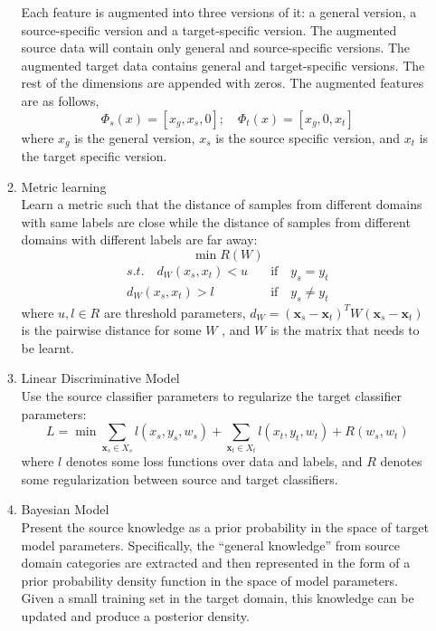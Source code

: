\documentclass[prodmode]{acmsmall}  %
\begin{document}
\begin{itemize}
\begin{enumerate}
Each feature is augmented into three versions of it: a general version, a source-specific version and a target-specific version. The augmented source data will contain only general and source-specific versions. The augmented target data contains general and target-specific versions. The rest of the dimensions are appended with zeros. The augmented features are as follows,
\begin{equation}
\Phi_s(x)=[x_g,x_s,0];\quad \Phi_t(x)=[x_g,0,x_t]
\end{equation}
where $x_g$ is the general version, $x_s$ is the source specific version, and $x_t$ is the target specific version. 
\item Metric learning~\cite{Saenko2010}\\
Learn a metric such that the distance of samples from different domains with same labels are close while the distance of samples from different domains with different labels are far away:
\begin{equation}
\min R(W)
\end{equation}
\begin{align*}
s.t. \quad   d_W(x_s,x_t)< \mathit{u} \quad & \text{if} \quad y_s=y_t\\
   d_W(x_s,x_t)> \mathit{l} \quad & \text{if} \quad y_s\neq y_t
\end{align*}
where ${u,l}\in R$ are threshold parameters, $d_W = (\mathbf{x}_s-\mathbf{x}_t)^TW(\mathbf{x}_s-\mathbf{x}_t)$ is the pairwise distance for some $W$ , and $W$ is the matrix that needs to be learnt.
\item Linear Discriminative Model~\cite{Yang2007} \\
Use the source classifier parameters to regularize the target classifier parameters:
\begin{equation}
L = \min \sum_{\mathbf{x}_s\in{X_s}} l(x_s,y_s,w_s)+ \sum_{\mathbf{x}_t\in{X_t}} l(x_t,y_t,w_t)+R(w_s,w_t)
\end{equation}
where $l$ denotes some loss functions
over data and labels, and $R$ denotes some regularization between source and target classifiers.
\item Bayesian Model~\cite{Fei-Fei2006}\\
Present the source knowledge as a prior probability in the space of target model parameters. Specifically, the ``general knowledge'' from source domain categories are extracted and then represented in the form of a prior probability density function in the space of model parameters. Given a small training set in the target domain, this knowledge can be updated and produce a posterior density.

\end{enumerate}
\end{itemize}
\end{document}
